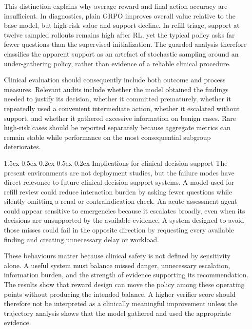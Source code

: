 \documentclass{article}
\makeatletter
\renewcommand{\paragraph}{%
  \@startsection{paragraph}{4}{\z@}%
                {1.5ex \@plus 0.5ex \@minus 0.2ex}%
                {0.5ex \@plus 0.2ex}%
                {\normalsize\bf}}
\makeatother
\begin{document}
This distinction explains why average reward and final action accuracy are
insufficient. In diagnostics, plain GRPO improves overall value relative to the
base model, but high-risk value and support decline. In refill triage, support at
twelve sampled rollouts remains high after RL, yet the typical policy asks far
fewer questions than the supervised initialization. The guarded analysis therefore
classifies the apparent support as an artefact of stochastic sampling around an
under-gathering policy, rather than evidence of a reliable clinical procedure.

Clinical evaluation should consequently include both outcome and process measures.
Relevant audits include whether the model obtained the findings needed to justify
its decision, whether it committed prematurely, whether it repeatedly used a
convenient intermediate action, whether it escalated without support, and whether
it gathered excessive information on benign cases. Rare high-risk cases should be
reported separately because aggregate metrics can remain stable while performance
on the most consequential subgroup deteriorates.

\paragraph{Implications for clinical decision support}
The present environments are not deployment studies, but the failure modes have
direct relevance to future clinical decision support systems. A model used for
refill review could reduce interaction burden by asking fewer questions while
silently omitting a renal or contraindication check. An acute assessment agent
could appear sensitive to emergencies because it escalates broadly, even when its
decisions are unsupported by the available evidence. A system designed to avoid
those misses could fail in the opposite direction by requesting every available
finding and creating unnecessary delay or workload.

These behaviours matter because clinical safety is not defined by sensitivity
alone. A useful system must balance missed danger, unnecessary escalation,
information burden, and the strength of evidence supporting its recommendation.
The results show that reward design can move the policy among these operating
points without producing the intended balance. A higher verifier score should
therefore not be interpreted as a clinically meaningful improvement unless the
trajectory analysis shows that the model gathered and used the appropriate
evidence.
\end{document}
